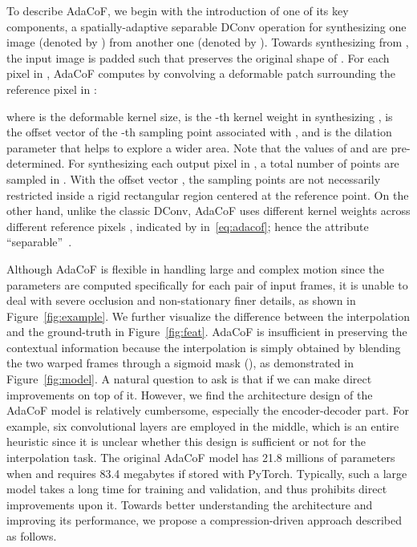 \documentclass[final]{cvpr}
\begin{document}
To describe AdaCoF, we begin with the introduction of one of its key components, a spatially-adaptive separable DConv operation for synthesizing one image (denoted by ) from another one (denoted by ). Towards synthesizing   from ,  the input image  is padded such that  preserves the original shape of .  For each pixel  in , AdaCoF computes   by convolving a deformable patch surrounding the reference pixel  in :
 
 \vspace{-.2in}

\vspace{-.1in}

\noindent 
where  is the deformable kernel size,  is the -th kernel weight in synthesizing ,  is the offset vector of the -th sampling point associated with , and  is the dilation parameter that helps to explore a wider area. Note that the values of  and  are pre-determined. For synthesizing each output pixel in , a total number of  points are sampled in . With the offset vector , the  sampling points are not necessarily restricted inside a rigid rectangular region centered at the reference point. On the other hand, unlike the classic DConv, AdaCoF uses different kernel weights across different reference pixels , indicated by  in~\eqref{eq:adacof}; hence the attribute ``separable''~\cite{niklaus2017video_sepcov}. 






Although AdaCoF is flexible in handling large and complex motion since the parameters  are computed specifically for each pair of input frames, it is unable to deal with severe occlusion and non-stationary finer details, as shown in Figure~\ref{fig:example}. We further visualize the difference between the interpolation and the ground-truth in Figure~\ref{fig:feat}. AdaCoF is insufficient in preserving the contextual information because the interpolation is simply obtained by blending the two warped frames through a sigmoid mask (), as demonstrated in Figure~\ref{fig:model}. A natural question to ask is that if we can make direct improvements on top of it. However, we find the architecture design of the AdaCoF model is relatively cumbersome, especially the encoder-decoder part. For example, six  convolutional layers are employed in the middle, which is an entire heuristic since it is unclear whether this design is sufficient or not for the interpolation task. The original AdaCoF model has 21.8 millions of parameters when   and requires 83.4 megabytes if stored with PyTorch. Typically, such a large model takes a long time for training and validation, and thus prohibits direct improvements upon it. Towards better understanding the architecture and improving its performance, we propose a compression-driven approach described as follows.
\end{document}
